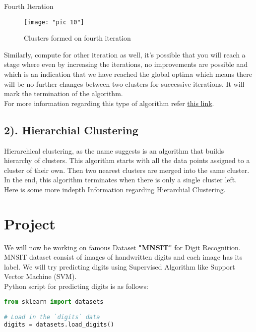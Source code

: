 \documentclass[Proceedings]{ascelike}
\begin{document}
{Fourth Iteration
\begin{figure}[!ht]
	\centering
	\texttt{[image: "pic 10"]}
	\caption{Clusters formed on fourth iteration }
	\label{fig:pic-9}
\end{figure}

Similarly, compute for other iteration as well, it's possible that you will reach a stage where even by increasing the iterations, no improvements are possible and which is an indication that we have reached the global optima which means there will be no further changes between two clusters for successive iterations. It will mark the termination of the algorithm.\\

For more information regarding this type of algorithm refer \href{https://home.deib.polimi.it/matteucc/Clustering/tutorial_html/kmeans.html}{this link}.

\subsection{2). Hierarchial Clustering}
Hierarchical clustering, as the name suggests is an algorithm that builds hierarchy of clusters. This algorithm starts with all the data points assigned to a cluster of their own. Then two nearest clusters are merged into the same cluster. In the end, this algorithm terminates when there is only a single cluster left.\\

\href{https://home.deib.polimi.it/matteucc/Clustering/tutorial_html/hierarchical.html}{Here} is some more indepth Information regarding Hierarchial Clustering. 

\newpage
\section{Project}

We will now be working on famous Dataset \textbf{"MNSIT"} for Digit Recognition.
MNSIT dataset consist of images of handwritten digits and each image has its label. We will try predicting digits using Supervised Algorithm like Support Vector Machine (SVM).\\

Python script for predicting digits is as follows:
\begin{lstlisting}[language=Python]
from sklearn import datasets

# Load in the `digits` data
digits = datasets.load_digits()


\end{lstlisting}}
\end{document}
